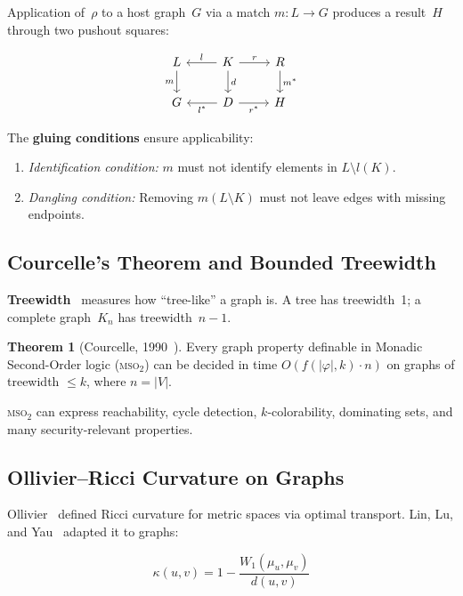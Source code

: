 \documentclass[11pt,a4paper]{article}
\theoremstyle{definition}
\newtheorem{theorem}{Theorem}[section]
\newcommand{\MSO}{\textsc{mso}}
\begin{document}
Application of~$\rho$ to a host graph~$G$ via a match $m\colon L \to G$
produces a result~$H$ through two pushout squares:

\begin{equation}\label{eq:dpo}
\begin{tikzcd}
  L \arrow[d, "m"'] & K \arrow[l, "l"'] \arrow[r, "r"] \arrow[d, "d"] & R \arrow[d, "m^*"] \\
  G & D \arrow[l, "l^*"] \arrow[r, "r^*"'] & H
\end{tikzcd}
\end{equation}

The \textbf{gluing conditions} ensure applicability:
\begin{enumerate}[nosep]
  \item \emph{Identification condition:} $m$ must not identify elements in
    $L \setminus l(K)$.
  \item \emph{Dangling condition:} Removing $m(L \setminus K)$ must not
    leave edges with missing endpoints.
\end{enumerate}

\subsection{Courcelle's Theorem and Bounded Treewidth}

\textbf{Treewidth}~\cite{robertson1986} measures how ``tree-like'' a graph
is. A tree has treewidth~1; a complete graph~$K_n$ has treewidth~$n-1$.

\begin{theorem}[Courcelle, 1990~\cite{courcelle1990}]
Every graph property definable in Monadic Second-Order logic (\MSO{}$_2$)
can be decided in time $O(f(|\varphi|, k) \cdot n)$ on graphs of treewidth
$\le k$, where $n = |V|$.
\end{theorem}

\MSO{}$_2$ can express reachability, cycle detection, $k$-colorability,
dominating sets, and many security-relevant properties.

\subsection{Ollivier--Ricci Curvature on Graphs}

Ollivier~\cite{ollivier2009} defined Ricci curvature for metric spaces via
optimal transport. Lin, Lu, and Yau~\cite{linluyau2011} adapted it to graphs:

\begin{equation}\label{eq:curvature}
\kappa(u,v) = 1 - \frac{W_1(\mu_u, \mu_v)}{d(u,v)}
\end{equation}
\end{document}
